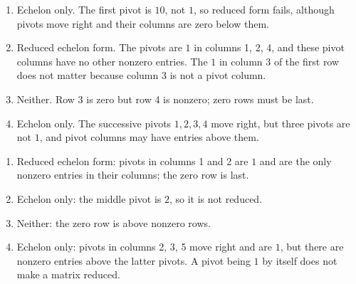 \begin{enumerate}[label=(\alph*)]
\item Echelon only. The first pivot is $10$, not $1$, so reduced form
fails, although pivots move right and their columns are zero below them.
\item Reduced echelon form. The pivots are $1$ in columns 1, 2, 4, and
these pivot columns have no other nonzero entries. The $1$ in column 3
of the first row does not matter because column 3 is not a pivot column.
\item Neither. Row 3 is zero but row 4 is nonzero; zero rows must be last.
\item Echelon only. The successive pivots $1,2,3,4$ move right, but
three pivots are not $1$, and pivot columns may have entries above them.
\end{enumerate}

\begin{enumerate}[label=(\alph*)]
\item Reduced echelon form: pivots in columns 1 and 2 are $1$ and are
the only nonzero entries in their columns; the zero row is last.
\item Echelon only: the middle pivot is $2$, so it is not reduced.
\item Neither: the zero row is above nonzero rows.
\item Echelon only: pivots in columns 2, 3, 5 move right and are $1$,
but there are nonzero entries above the latter pivots. A pivot being $1$
by itself does not make a matrix reduced.
\end{enumerate}

